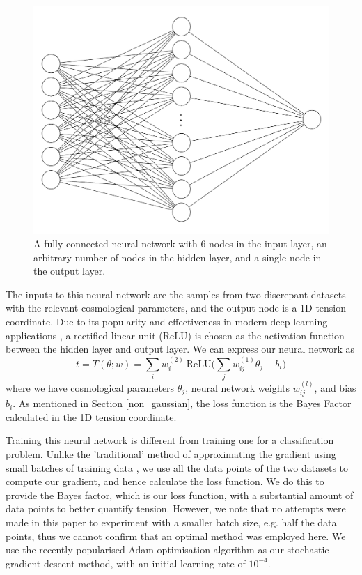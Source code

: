 \documentclass[%
 reprint,
 amsmath,amssymb,
 aps,
]{revtex4-2}
\begin{document}
\begin{figure}
    \includegraphics[width=0.8\columnwidth]{images/nn.png}
    \centering
    \caption{A fully-connected neural network with 6 nodes in the input layer, an arbitrary number of nodes in the hidden layer, and a single node in the output layer.}
    \label{fig:NN}
\end{figure}

The inputs to this neural network are the samples from two discrepant datasets with the relevant cosmological parameters, and the output node is a 1D tension coordinate. Due to its popularity and effectiveness in modern deep learning applications \cite{Nwankpa2018}, a rectified linear unit (ReLU) \cite{Nair2010} is chosen as the activation function between the hidden layer and output layer. We can express our neural network as
\begin{equation}
    t = T(\theta; w) = \sum_i w^{(2)}_i \ \textrm{ReLU} \bigg( \sum_j w^{(1)}_{ij} \theta_j + b_i \bigg)
\end{equation}
where we have cosmological parameters $\theta_{j}$, neural network weights $w^{(l)}_{ij}$, and bias $b_i$. As mentioned in Section \ref{non_gaussian}, the loss function is the Bayes Factor calculated in the 1D tension coordinate.

Training this neural network is different from training one for a classification problem. Unlike the 'traditional' method of approximating the gradient using small batches of training data \cite{Keskar2017}, we use all the data points of the two datasets to compute our gradient, and hence calculate the loss function. We do this to provide the Bayes factor, which is our loss function, with a substantial amount of data points to better quantify tension. However, we note that no attempts were made in this paper to experiment with a smaller batch size, e.g. half the data points, thus we cannot confirm that an optimal method was employed here. We use the recently popularised Adam optimisation algorithm \cite{Kingma2017} as our stochastic gradient descent method, with an initial learning rate of $10^{-4}$.
\end{document}
